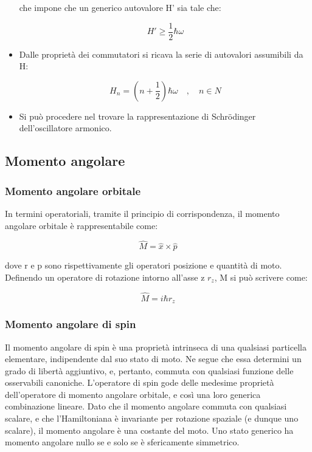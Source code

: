 \documentclass{article}
\begin{document}
\begin{itemize}
    che impone che un generico autovalore H' sia tale che:

    \begin{equation}
        H'\geq \frac{1}{2}\hbar \omega
    \end{equation}

    \item Dalle proprietà dei commutatori si ricava la serie di autovalori assumibili da H:
    
    \begin{equation}
        H_n=(n+\frac{1}{2})\hbar \omega \quad , \quad n \in N
    \end{equation}

    \item Si può procedere nel trovare la rappresentazione di Schrödinger dell'oscillatore armonico.
\end{itemize}

\subsection{Momento angolare}
\subsubsection{Momento angolare orbitale}
In termini operatoriali, tramite il principio di corrispondenza, il momento angolare orbitale è rappresentabile come:

\begin{equation}
    \hat{M}=\hat{x}\times \hat{p}
\end{equation}

dove r e p sono rispettivamente gli operatori posizione e quantità di moto.
Definendo un operatore di rotazione intorno all'asse z $r_z$, M si può scrivere come:

\begin{equation}
    \hat{M}= i\hbar r_z
\end{equation}

\subsubsection{Momento angolare di spin}
Il momento angolare di spin è una proprietà intrinseca di una qualsiasi particella elementare, indipendente dal suo stato di moto.
Ne segue che essa determini un grado di libertà aggiuntivo, e, pertanto, commuta con qualsiasi funzione delle osservabili canoniche.
L'operatore di spin gode delle medesime proprietà dell'operatore di momento angolare orbitale, e così una loro generica combinazione lineare.
Dato che il momento angolare commuta con qualsiasi scalare, e che l'Hamiltoniana è invariante per rotazione spaziale (e dunque uno scalare), il momento angolare è una costante del moto.
Uno stato generico ha momento angolare nullo se e solo se è sfericamente simmetrico.
\end{document}
